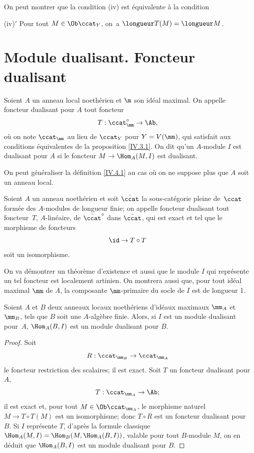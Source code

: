\begin{remarque} \label{IV.3.2}
On peut montrer que la condition (iv) est \'equivalente \`a la condition

(iv)$'$ Pour tout $M\in \Ob \ccat_{Y}$, on~a $\longueur T(M)=\longueur M$.
\end{remarque}

\section{Module dualisant. Foncteur dualisant} \label{IV.4}

\begin{definition} \label{IV.4.1}
Soient $A$ un anneau local noeth\'erien et $\m$ son id\'eal maximal. On appelle foncteur dualisant pour $A$ tout foncteur
$$
T:\ccat^{\circ}_\mm\to \Ab,
$$
o\`u on note $\ccat_{\mm}$ au lieu de $\ccat_{Y}$ pour $Y=V(\mm)$, qui satisfait aux conditions \'equivalentes de la proposition \ref{IV.3.1}. On dit qu'un $A$-module $I$ est dualisant pour $A$ si le foncteur $M\to \Hom_{A}(M, I)$ est dualisant.
\end{definition}

On peut g\'en\'eraliser la d\'efinition \ref{IV.4.1} au cas o\`u on ne suppose plus que $A$ soit un anneau local.

\begin{definition} \label{IV.4.2}
Soient $A$ un anneau noeth\'erien et soit $\bar{\ccat}$ la sous-cat\'egorie pleine de~$\ccat$ form\'ee des $A$-modules de longueur finie; on appelle foncteur dualisant tout foncteur~$T$, $A$-lin\'eaire, de $\bar{\ccat}^{\circ}$ dans $\bar{\ccat}$, qui est exact et tel que le morphisme de foncteurs
$$
\id \to T\circ T
$$
soit un isomorphisme.
\end{definition}

On va d\'emontrer un th\'eor\`eme d'existence et aussi que le module $I$ qui repr\'esente un tel foncteur est localement artinien. On montrera aussi que, pour tout id\'eal maximal $\mm$ de $A$, la composante $\mm$-primaire du socle de $I$ est de longueur 1.

\begin{proposition} \label{IV.4.3}
Soient $A$ et $B$ deux anneaux locaux noeth\'eriens d'id\'eaux maximaux $\mm_{A}$ et $\mm_{B}$, tels que $B$ soit une $A$-alg\`ebre finie. Alors, si $I$ est un module dualisant pour~$A$, $\Hom_{A}(B, I)$ est un module dualisant pour $B$.
\end{proposition}

\begin{proof}
Soit
$$
R: \ccat_{\mm_{B}}\to \ccat_{\mm_{A}}
$$
le foncteur restriction des scalaires; il est exact. Soit $T$ un foncteur dualisant pour $A$,
$$
T: \ccat_{\mm_{A}}\to \Ab;
$$
il est exact et, pour tout $M\in \Ob \ccat_{\mm_{A}}$, le morphisme naturel $M\to T\circ T(M)$ est un isomorphisme; donc $T\circ R$ est un foncteur dualisant pour $B$. Si $I$ repr\'esente $T$, d'apr\`es la formule classique $\Hom_{A}(M, I)=\Hom_{B}(M, \Hom_{A}(B, I))$, valable pour tout $B$-module $M$, on en d\'eduit que $\Hom_{A}(B, I)$ est un module dualisant pour $B$.
\skipqed
\end{proof}

